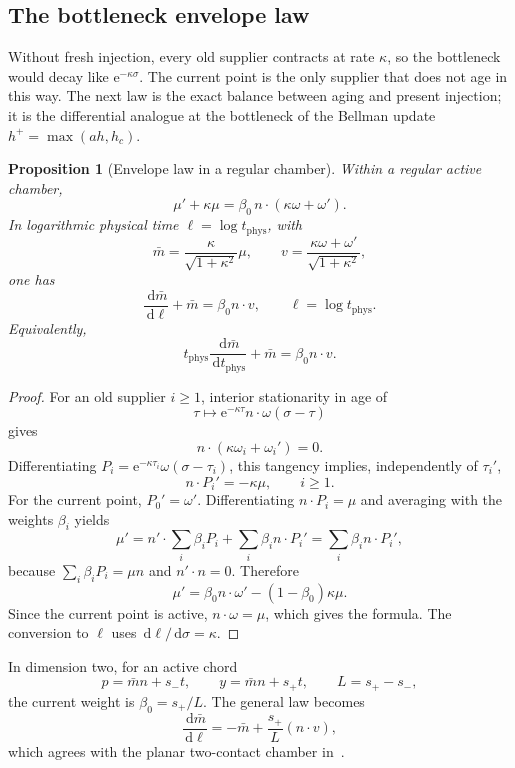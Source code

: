 \documentclass[10pt,a4paper]{article}
\newcommand{\dd}{\,\mathrm{d}}
\newcommand{\e}{\mathrm{e}}
\theoremstyle{plain}
\newtheorem{proposition}[theorem]{Proposition}
\theoremstyle{definition}
\theoremstyle{remark}
\begin{document}
\subsection{The bottleneck envelope law}

Without fresh injection, every old supplier contracts at rate $\kappa$, so the bottleneck would decay like $\e^{-\kappa\sigma}$. The current point is the only supplier that does not age in this way. The next law is the exact balance between aging and present injection; it is the differential analogue at the bottleneck of the Bellman update $h^+=\max(ah,h_c)$.

\begin{proposition}[Envelope law in a regular chamber]
Within a regular active chamber,
\[
  \mu'+\kappa\mu
  =\beta_0\,n\cdot(\kappa\omega+\omega').
\]
In logarithmic physical time $\ell=\log t_{\mathrm{phys}}$, with
\[
  \bar m=\frac{\kappa}{\sqrt{1+\kappa^2}}\mu,
  \qquad
  v=\frac{\kappa\omega+\omega'}{\sqrt{1+\kappa^2}},
\]
one has
\[
  \frac{\dd\bar m}{\dd\ell}+\bar m=\beta_0n\cdot v,
  \qquad \ell=\log t_{\mathrm{phys}}.
\]
Equivalently,
\[
  t_{\mathrm{phys}}\frac{\dd\bar m}{\dd t_{\mathrm{phys}}}+\bar m
  =\beta_0n\cdot v.
\]
\end{proposition}

\begin{proof}
For an old supplier $i\ge1$, interior stationarity in age of
\[
  \tau\longmapsto \e^{-\kappa\tau}n\cdot\omega(\sigma-\tau)
\]
gives
\[
  n\cdot(\kappa\omega_i+\omega_i')=0.
\]
Differentiating $P_i=\e^{-\kappa\tau_i}\omega(\sigma-\tau_i)$, this tangency implies, independently of $\tau_i'$,
\[
  n\cdot P_i'=-\kappa\mu,
  \qquad i\ge1.
\]
For the current point, $P_0'=\omega'$. Differentiating $n\cdot P_i=\mu$ and averaging with the weights $\beta_i$ yields
\[
  \mu'
  =n'\cdot\sum_i\beta_iP_i+
    \sum_i\beta_i n\cdot P_i'
  =\sum_i\beta_i n\cdot P_i',
\]
because $\sum_i\beta_iP_i=\mu n$ and $n'\cdot n=0$. Therefore
\[
  \mu'=\beta_0n\cdot\omega'-(1-\beta_0)\kappa\mu.
\]
Since the current point is active, $n\cdot\omega=\mu$, which gives the formula. The conversion to $\ell$ uses $\dd\ell/\dd\sigma=\kappa$.
\end{proof}

In dimension two, for an active chord
\[
  p=\bar mn+s_-t,
  \qquad
  y=\bar mn+s_+t,
  \qquad
  L=s_+-s_-,
\]
the current weight is $\beta_0=s_+/L$. The general law becomes
\[
  \frac{\dd\bar m}{\dd\ell}
  =-\bar m+\frac{s_+}{L}(n\cdot v),
\]
which agrees with the planar two-contact chamber in~\cite[Section~C.3]{koch-cell}.
\end{document}
